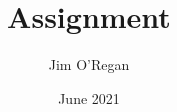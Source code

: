 \documentclass{article}[11pt]
\title{Assignment}
\author{Jim O'Regan}
\date{June 2021}
\begin{document}
\maketitle

\citep{fujimura_syllable_1975}





%
\end{document}
